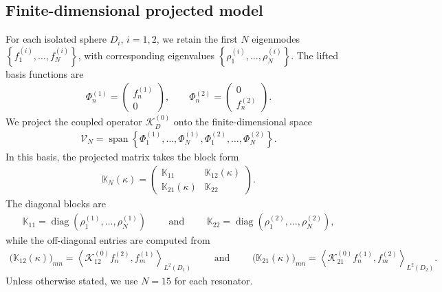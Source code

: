 \documentclass[10pt]{article}
\numberwithin{equation}{section}
\begin{document}
\subsection{Finite-dimensional projected model}

For each isolated sphere $D_i$, $i=1,2$, we retain the first $N$ eigenmodes $\left\{f_1^{(i)},\dots,f_N^{(i)}\right\}$, with corresponding eigenvalues $\left\{\rho_1^{(i)},\dots,\rho_N^{(i)}\right\}$. The lifted basis functions are
\begin{align*}
    \Phi_n^{(1)} =
    \begin{pmatrix}
        f_n^{(1)}\\0
    \end{pmatrix},
    \qquad
    \Phi_n^{(2)} =
    \begin{pmatrix}
        0\\f_n^{(2)}
    \end{pmatrix}.
\end{align*}
We project the coupled operator $\mathcal K_D^{(0)}$ onto the finite-dimensional space
\begin{align*}
    \mathcal{V}_N = \operatorname{span} \left\{ \Phi_1^{(1)},\dots,\Phi_N^{(1)}, \Phi_1^{(2)},\dots,\Phi_N^{(2)} \right\}.
\end{align*}
In this basis, the projected matrix takes the block form
\begin{align}
    \mathbb K_N(\kappa) =
    \begin{pmatrix}
        \mathbb K_{11} & \mathbb K_{12}(\kappa)\\
        \mathbb K_{21}(\kappa) & \mathbb K_{22}
    \end{pmatrix}.
\end{align}
The diagonal blocks are
\begin{align}
    \mathbb K_{11} = \operatorname{diag} \left( \rho_1^{(1)},\dots,\rho_N^{(1)} \right)
    \qquad \text{ and } \qquad
    \mathbb K_{22} = \operatorname{diag} \left( \rho_1^{(2)},\dots,\rho_N^{(2)} \right),
\end{align}
while the off-diagonal entries are computed from
\begin{align}
    \Big(\mathbb K_{12}(\kappa)\Big)_{mn} = \left\langle \mathcal K_{12}^{(0)} f_n^{(2)}, f_m^{(1)} \right\rangle_{L^2(D_1)}
    \qquad \text{ and } \qquad
    \Big(\mathbb K_{21}(\kappa)\Big)_{mn} = \left\langle \mathcal K_{21}^{(0)} f_n^{(1)}, f_m^{(2)} \right\rangle_{L^2(D_2)}.
\end{align}
Unless otherwise stated, we use $N=15$ for each resonator.
\end{document}
